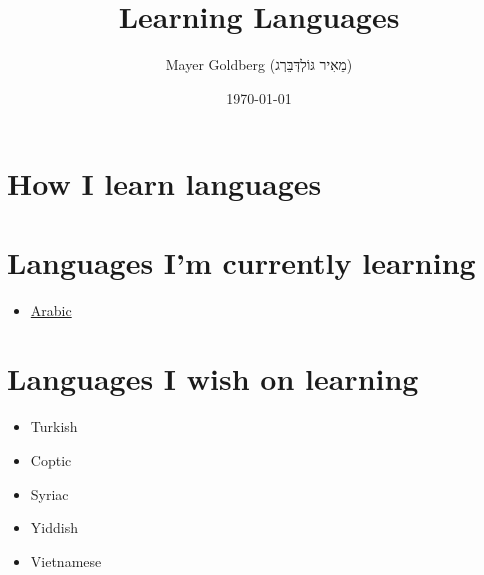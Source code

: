 \documentclass[11pt]{article}
\author{Mayer Goldberg (מֵאִיר גּוֹלְדְּבֵּרְג)}
\date{\today}
\title{Learning Languages}
\begin{document}
\maketitle
\tableofcontents


\section{How I learn languages}
\label{sec:orga4da55e}

\section{Languages I'm currently learning}
\label{sec:orgdb6a950}
\begin{itemize}
\item \href{./arabic/arabic.html}{Arabic}
\end{itemize}

\section{Languages I wish on learning}
\label{sec:org60f2d0c}
\begin{itemize}
\item Turkish
\item Coptic
\item Syriac
\item Yiddish
\item Vietnamese
\end{itemize}
\end{document}
